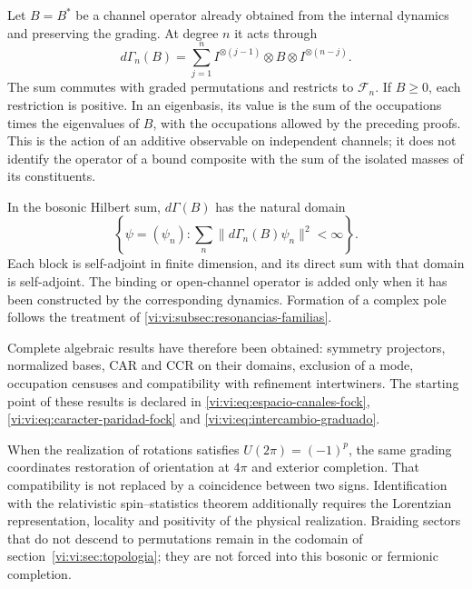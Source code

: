 Let \(B=B^*\) be a channel operator already obtained from the
internal dynamics and preserving the grading. At degree \(n\)
it acts through
\[
 d\Gamma_n(B)=\sum_{j=1}^n
 I^{\otimes(j-1)}\otimes B\otimes I^{\otimes(n-j)}.
\]
The sum commutes with graded permutations and restricts
to \(\mathcal F_n\). If \(B\ge0\), each restriction is positive.
In an eigenbasis, its value is the sum of the occupations
times the eigenvalues of \(B\), with the occupations
allowed by the preceding proofs. This is the action
of an additive observable on independent channels;
it does not identify the operator of a bound composite with the
sum of the isolated masses of its constituents.

In the bosonic Hilbert sum, \(d\Gamma(B)\) has the
natural domain
\[
 \left\{\psi=(\psi_n):
 \sum_n\|d\Gamma_n(B)\psi_n\|^2<\infty\right\}.
\]
Each block is self-adjoint in finite dimension, and its direct
sum with that domain is self-adjoint. The binding
or open-channel operator is added only when it has been constructed
by the corresponding dynamics. Formation of a complex
pole follows the treatment of
\ref{vi:vi:subsec:resonancias-familias}.

Complete algebraic results have therefore been obtained:
symmetry projectors, normalized bases, CAR and CCR on
their domains, exclusion of a mode, occupation censuses and
compatibility with refinement intertwiners. The starting
point of these results is declared in
\eqref{vi:vi:eq:espacio-canales-fock},
\eqref{vi:vi:eq:caracter-paridad-fock} and
\eqref{vi:vi:eq:intercambio-graduado}.

When the realization of rotations satisfies
\(U(2\pi)=(-1)^p\), the same grading coordinates
restoration of orientation at \(4\pi\) and exterior
completion. That compatibility is not replaced by a
coincidence between two signs. Identification with the
relativistic spin--statistics theorem additionally requires
the Lorentzian representation, locality and positivity
of the physical realization. Braiding sectors that do not
descend to permutations remain in the codomain of
section~\ref{vi:vi:sec:topologia}; they are not forced into
this bosonic or fermionic completion.

